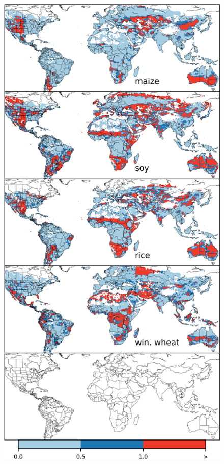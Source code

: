 \documentclass[10pt]{article}
\begin{document}
\begin{figure}[h!]
\centering
\begin{minipage}{.45\textwidth}
    \centering
    \includegraphics[width=\textwidth]{s_em_err_JULES.png}\\

\end{minipage}
\end{figure}
\end{document}
